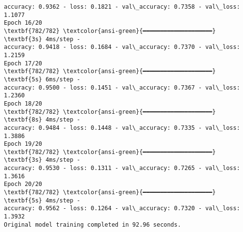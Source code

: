 \documentclass[11pt]{article}
\begin{document}
\begin{Verbatim}[commandchars=\\\{\}]
accuracy: 0.9362 - loss: 0.1821 - val\_accuracy: 0.7358 - val\_loss: 1.1077
Epoch 16/20
\textbf{782/782} \textcolor{ansi-green}{━━━━━━━━━━━━━━━━━━━━} \textbf{3s} 4ms/step -
accuracy: 0.9418 - loss: 0.1684 - val\_accuracy: 0.7370 - val\_loss: 1.2159
Epoch 17/20
\textbf{782/782} \textcolor{ansi-green}{━━━━━━━━━━━━━━━━━━━━} \textbf{5s} 6ms/step -
accuracy: 0.9500 - loss: 0.1451 - val\_accuracy: 0.7367 - val\_loss: 1.2360
Epoch 18/20
\textbf{782/782} \textcolor{ansi-green}{━━━━━━━━━━━━━━━━━━━━} \textbf{8s} 4ms/step -
accuracy: 0.9484 - loss: 0.1448 - val\_accuracy: 0.7335 - val\_loss: 1.3886
Epoch 19/20
\textbf{782/782} \textcolor{ansi-green}{━━━━━━━━━━━━━━━━━━━━} \textbf{3s} 4ms/step -
accuracy: 0.9530 - loss: 0.1311 - val\_accuracy: 0.7265 - val\_loss: 1.3616
Epoch 20/20
\textbf{782/782} \textcolor{ansi-green}{━━━━━━━━━━━━━━━━━━━━} \textbf{5s} 4ms/step -
accuracy: 0.9562 - loss: 0.1264 - val\_accuracy: 0.7320 - val\_loss: 1.3932
Original model training completed in 92.96 seconds.


\end{Verbatim}
\end{document}
